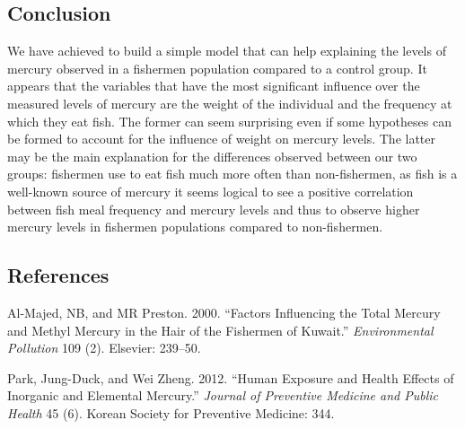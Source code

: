 \documentclass[12pt,]{article}
\begin{document}
\subsection{Conclusion}\label{conclusion}

We have achieved to build a simple model that can help explaining the
levels of mercury observed in a fishermen population compared to a
control group. It appears that the variables that have the most
significant influence over the measured levels of mercury are the weight
of the individual and the frequency at which they eat fish. The former
can seem surprising even if some hypotheses can be formed to account for
the influence of weight on mercury levels. The latter may be the main
explanation for the differences observed between our two groups:
fishermen use to eat fish much more often than non-fishermen, as fish is
a well-known source of mercury it seems logical to see a positive
correlation between fish meal frequency and mercury levels and thus to
observe higher mercury levels in fishermen populations compared to
non-fishermen.

\subsection*{References}\label{references}

\hypertarget{refs}{}
\hypertarget{ref-al2000factors}{}
Al-Majed, NB, and MR Preston. 2000. ``Factors Influencing the Total
Mercury and Methyl Mercury in the Hair of the Fishermen of Kuwait.''
\emph{Environmental Pollution} 109 (2). Elsevier: 239--50.

\hypertarget{ref-park2012human}{}
Park, Jung-Duck, and Wei Zheng. 2012. ``Human Exposure and Health
Effects of Inorganic and Elemental Mercury.'' \emph{Journal of
Preventive Medicine and Public Health} 45 (6). Korean Society for
Preventive Medicine: 344.
\end{document}
